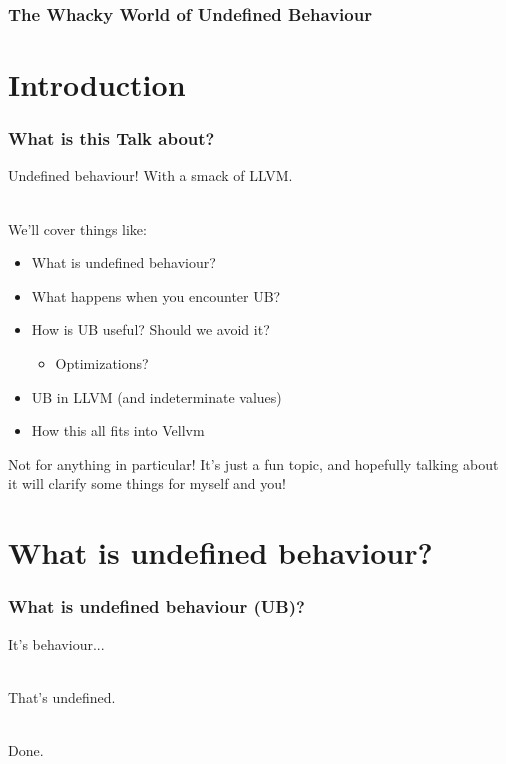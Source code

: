 \documentclass[handout]{beamer}
\author{
  Beck, Calvin\\
  \href{mailto:hobbes@seas.upenn.edu}{hobbes@seas.upenn.edu}
}
\begin{document}
\begin{frame}
  \frametitle{The Whacky World of Undefined Behaviour}
  \maketitle
\end{frame}

\section{Introduction}

\begin{frame}
  \frametitle{What is this Talk about?}

  Undefined behaviour! With a smack of LLVM.\\~\

  We'll cover things like:

  \begin{itemize}
  \item What is undefined behaviour?
  \item What happens when you encounter UB?
  \item How is UB useful? Should we avoid it?
    \begin{itemize}
    \item Optimizations?
    \end{itemize}
  \item UB in LLVM (and indeterminate values)
  \item How this all fits into Vellvm
  \end{itemize}
  \vspace{\baselineskip}
  Not for anything in particular! It's just a fun topic, and hopefully
  talking about it will clarify some things for myself and you!

\end{frame}

\section{What is undefined behaviour?}

\begin{frame}[fragile]
  \frametitle{What is undefined behaviour (UB)?}

  It's behaviour...\\~

  \pause

  That's undefined.\\~

  \pause

  \huge{Done.}

\end{frame}
\end{document}
